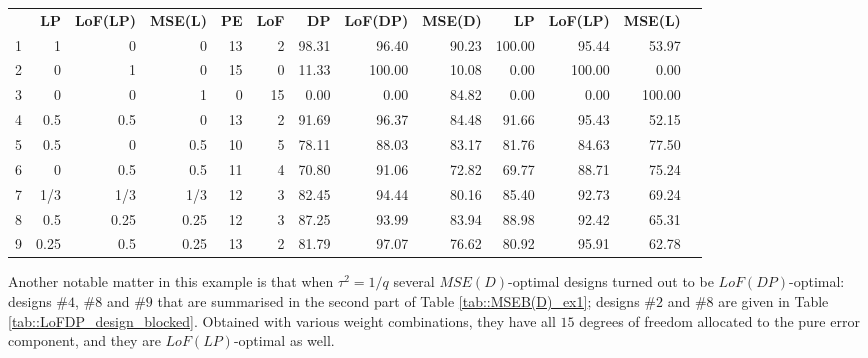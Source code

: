 \begin{table}[h]
{\begin{tabular}{rrrrrrrrrrrrr}
   & \textbf{LP}       & \textbf{LoF(LP)}    & \textbf{MSE(L)}   & \textbf{PE}        & \textbf{LoF}        & \textbf{DP}   & \textbf{LoF(DP)}   & \textbf{MSE(D)}  & \textbf{LP}       & \textbf{LoF(LP)}   & \textbf{MSE(L)}  \\
1 & 1 & 0 & 0 & \multicolumn{1}{|r}{13} & \multicolumn{1}{r|}{2} & 98.31 & 96.40 & 90.23 & \multicolumn{1}{|r}{100.00} & 95.44 & 53.97 \\
2 & 0 & 1 & 0 & \multicolumn{1}{|r}{15} & \multicolumn{1}{r|}{0} & 11.33 & 100.00 & 10.08 & \multicolumn{1}{|r}{0.00} & 100.00 & 0.00 \\
3 & 0 & 0 & 1 & \multicolumn{1}{|r}{0} & \multicolumn{1}{r|}{15} & 0.00 & 0.00 & 84.82 & \multicolumn{1}{|r}{0.00} & 0.00 & 100.00 \\
4 & 0.5 & 0.5 & 0 & \multicolumn{1}{|r}{13} & \multicolumn{1}{r|}{2} & 91.69 & 96.37 & 84.48 & \multicolumn{1}{|r}{91.66} & 95.43 & 52.15 \\
5 & 0.5 & 0 & 0.5 & \multicolumn{1}{|r}{10} & \multicolumn{1}{r|}{5} & 78.11 & 88.03 & 83.17 & \multicolumn{1}{|r}{81.76} & 84.63 & 77.50 \\
6 & 0 & 0.5 & 0.5 & \multicolumn{1}{|r}{11} & \multicolumn{1}{r|}{4} & 70.80 & 91.06 & 72.82 & \multicolumn{1}{|r}{69.77} & 88.71 & 75.24 \\
7 & 1/3 & 1/3 & 1/3 & \multicolumn{1}{|r}{12} & \multicolumn{1}{r|}{3} & 82.45 & 94.44 & 80.16 & \multicolumn{1}{|r}{85.40} & 92.73 & 69.24 \\
8 & 0.5 & 0.25 & 0.25 & \multicolumn{1}{|r}{12} & \multicolumn{1}{r|}{3} & 87.25 & 93.99 & 83.94 & \multicolumn{1}{|r}{88.98} & 92.42 & 65.31 \\
9 & 0.25 & 0.5 & 0.25 & \multicolumn{1}{|r}{13} & \multicolumn{1}{r|}{2} & 81.79 & 97.07 & 76.62 & \multicolumn{1}{|r}{80.92} & 95.91 & 62.78
\end{tabular}
}
\end{table}

Another notable matter in this example is that when $\tau^2=1/q$ several $MSE(D)$-optimal designs turned out to be $LoF(DP)$-optimal: designs \#$4$, \#$8$ and \#$9$ that are summarised in the second part of Table \ref{tab::MSEB(D)_ex1}; designs \#$2$ and \#$8$ are given in Table \ref{tab::LoFDP_design_blocked}.  Obtained with various weight combinations, they have all $15$ degrees of freedom allocated to the pure error component, and they are $LoF(LP)$-optimal as well. 

